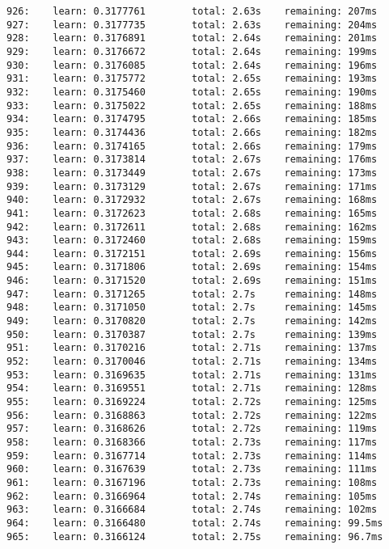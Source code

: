 \documentclass[11pt]{article}
\begin{document}
\begin{Verbatim}[commandchars=\\\{\}]
926:    learn: 0.3177761        total: 2.63s    remaining: 207ms
927:    learn: 0.3177735        total: 2.63s    remaining: 204ms
928:    learn: 0.3176891        total: 2.64s    remaining: 201ms
929:    learn: 0.3176672        total: 2.64s    remaining: 199ms
930:    learn: 0.3176085        total: 2.64s    remaining: 196ms
931:    learn: 0.3175772        total: 2.65s    remaining: 193ms
932:    learn: 0.3175460        total: 2.65s    remaining: 190ms
933:    learn: 0.3175022        total: 2.65s    remaining: 188ms
934:    learn: 0.3174795        total: 2.66s    remaining: 185ms
935:    learn: 0.3174436        total: 2.66s    remaining: 182ms
936:    learn: 0.3174165        total: 2.66s    remaining: 179ms
937:    learn: 0.3173814        total: 2.67s    remaining: 176ms
938:    learn: 0.3173449        total: 2.67s    remaining: 173ms
939:    learn: 0.3173129        total: 2.67s    remaining: 171ms
940:    learn: 0.3172932        total: 2.67s    remaining: 168ms
941:    learn: 0.3172623        total: 2.68s    remaining: 165ms
942:    learn: 0.3172611        total: 2.68s    remaining: 162ms
943:    learn: 0.3172460        total: 2.68s    remaining: 159ms
944:    learn: 0.3172151        total: 2.69s    remaining: 156ms
945:    learn: 0.3171806        total: 2.69s    remaining: 154ms
946:    learn: 0.3171520        total: 2.69s    remaining: 151ms
947:    learn: 0.3171265        total: 2.7s     remaining: 148ms
948:    learn: 0.3171050        total: 2.7s     remaining: 145ms
949:    learn: 0.3170820        total: 2.7s     remaining: 142ms
950:    learn: 0.3170387        total: 2.7s     remaining: 139ms
951:    learn: 0.3170216        total: 2.71s    remaining: 137ms
952:    learn: 0.3170046        total: 2.71s    remaining: 134ms
953:    learn: 0.3169635        total: 2.71s    remaining: 131ms
954:    learn: 0.3169551        total: 2.71s    remaining: 128ms
955:    learn: 0.3169224        total: 2.72s    remaining: 125ms
956:    learn: 0.3168863        total: 2.72s    remaining: 122ms
957:    learn: 0.3168626        total: 2.72s    remaining: 119ms
958:    learn: 0.3168366        total: 2.73s    remaining: 117ms
959:    learn: 0.3167714        total: 2.73s    remaining: 114ms
960:    learn: 0.3167639        total: 2.73s    remaining: 111ms
961:    learn: 0.3167196        total: 2.73s    remaining: 108ms
962:    learn: 0.3166964        total: 2.74s    remaining: 105ms
963:    learn: 0.3166684        total: 2.74s    remaining: 102ms
964:    learn: 0.3166480        total: 2.74s    remaining: 99.5ms
965:    learn: 0.3166124        total: 2.75s    remaining: 96.7ms

\end{Verbatim}
\end{document}

